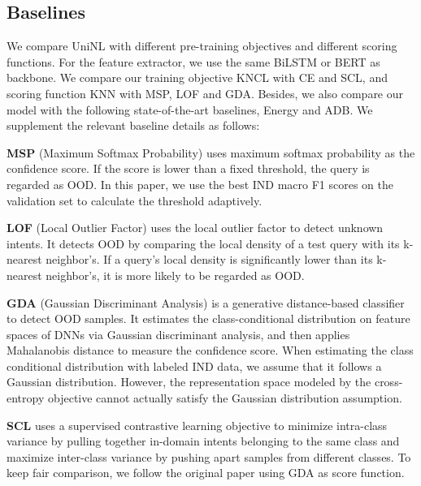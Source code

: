 \documentclass[11pt]{article}
\begin{document}
\subsection{Baselines}
We compare UniNL with different pre-training objectives and different scoring functions. For the feature extractor, we use the same BiLSTM\cite{Hochreiter1997LongSM} or BERT \cite{Devlin2019BERTPO} as backbone. We compare our training objective KNCL with CE and SCL\cite{zeng-etal-2021-modeling}, and scoring function KNN with MSP\cite{Hendrycks2017ABF}, LOF\cite{Lin2019DeepUI} and GDA\cite{xu-etal-2020-deep}. Besides, we also compare our model with the following state-of-the-art baselines, Energy\cite{ouyang-etal-2021-energy} and ADB\cite{Zhang2021DeepOI}. We supplement the relevant baseline details as follows:

\noindent\textbf{MSP} (Maximum Softmax Probability)\cite{Hendrycks2017ABF} uses maximum softmax probability as the confidence score. If the score is lower than a fixed threshold, the query is regarded as OOD. In this paper, we use the best IND macro F1 scores on the validation set to calculate the threshold adaptively.

\noindent\textbf{LOF} (Local Outlier Factor)\cite{Lin2019DeepUI} uses the local outlier factor to detect unknown intents. It detects OOD by comparing the local density of a test query with its k-nearest neighbor’s. If a query’s local density is significantly lower than its k-nearest neighbor’s, it is more likely to be regarded as OOD.

\noindent\textbf{GDA} (Gaussian Discriminant Analysis)\cite{xu-etal-2020-deep} is a generative distance-based classifier to detect OOD samples. It estimates the class-conditional distribution on feature spaces of DNNs via Gaussian discriminant analysis, and then applies Mahalanobis distance to measure the confidence score. When estimating the class conditional distribution with labeled IND data, we assume that it follows a Gaussian distribution. However, the representation space modeled by the cross-entropy objective cannot actually satisfy the Gaussian distribution assumption.


\noindent\textbf{SCL} \cite{zeng-etal-2021-modeling} uses a supervised contrastive learning objective to minimize intra-class variance by pulling together in-domain intents belonging to the same class and maximize inter-class variance by pushing apart samples from different classes. To keep fair comparison, we follow the original paper using GDA as score function.
\end{document}
